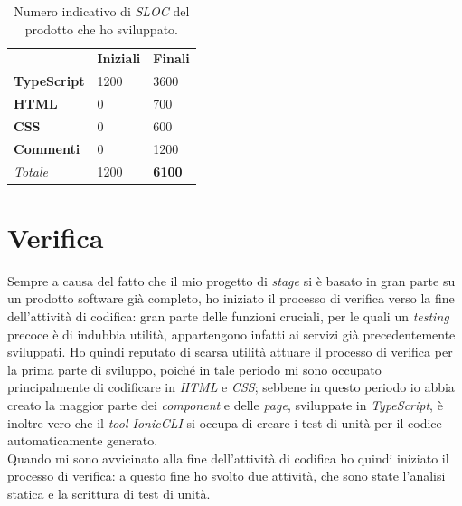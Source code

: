 \begin{table}[h]
  \centering
  \label{tab:sloc}
  \begin{tabular}{lll}
    & \textbf{Iniziali}        & \textbf{Finali}                  \\ \cline{2-3}
\multicolumn{1}{l|}{\textbf{TypeScript}} & \multicolumn{1}{l|}{1200} & \multicolumn{1}{l|}{3600}        \\ \cline{2-3}
\multicolumn{1}{l|}{\textbf{HTML}}       & \multicolumn{1}{l|}{0}  & \multicolumn{1}{l|}{700}           \\ \cline{2-3}
\multicolumn{1}{l|}{\textbf{CSS}}        & \multicolumn{1}{l|}{0}  & \multicolumn{1}{l|}{600}           \\ \cline{2-3}
\multicolumn{1}{l|}{\textbf{Commenti}}   & \multicolumn{1}{l|}{0} & \multicolumn{1}{l|}{1200}           \\ \cline{2-3}
\multicolumn{1}{l|}{\textit{Totale}}     & \multicolumn{1}{l|}{1200} & \multicolumn{1}{l|}{\textbf{6100}} \\ \cline{2-3}
\end{tabular}
\caption{Numero indicativo di \textit{SLOC} del prodotto che ho sviluppato.}
\end{table}



\section{Verifica}

Sempre a causa del fatto che il mio progetto di \textit{stage} si è basato in gran parte su un prodotto software già completo, ho iniziato il processo di verifica verso la fine dell'attività di codifica: gran parte delle funzioni cruciali, per le quali un \textit{testing} precoce è di indubbia utilità, appartengono infatti ai servizi già precedentemente sviluppati. Ho quindi reputato di scarsa utilità attuare il processo di verifica per la prima parte di sviluppo, poiché in tale periodo mi sono occupato principalmente di codificare in \textit{HTML} e \textit{CSS}; sebbene in questo periodo io abbia creato la maggior parte dei \textit{component} e delle \textit{page}, sviluppate in \textit{TypeScript}, è inoltre vero che il \textit{tool IonicCLI} si occupa di creare i test di unità per il codice automaticamente generato. \\
Quando mi sono avvicinato alla fine dell'attività di codifica ho quindi iniziato il processo di verifica: a questo fine ho svolto due attività, che sono state l'analisi statica e la scrittura di test di unità.


